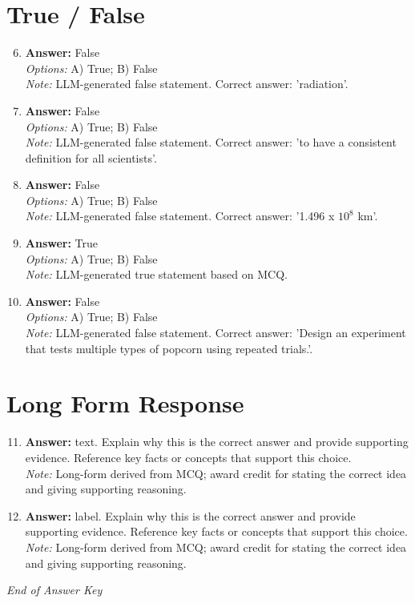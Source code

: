 \documentclass[12pt]{article}
\begin{document}
\section*{True / False}
\begin{enumerate}[label=\arabic*.]
\setcounter{enumi}{5}
\item \textbf{Answer:} False
\\ \textit{Options:} A) True; B) False
\\ \textit{Note:} LLM-generated false statement. Correct answer: 'radiation'.
\item \textbf{Answer:} False
\\ \textit{Options:} A) True; B) False
\\ \textit{Note:} LLM-generated false statement. Correct answer: 'to have a consistent definition for all scientists'.
\item \textbf{Answer:} False
\\ \textit{Options:} A) True; B) False
\\ \textit{Note:} LLM-generated false statement. Correct answer: '1.496 x $10^8$ km'.
\item \textbf{Answer:} True
\\ \textit{Options:} A) True; B) False
\\ \textit{Note:} LLM-generated true statement based on MCQ.
\item \textbf{Answer:} False
\\ \textit{Options:} A) True; B) False
\\ \textit{Note:} LLM-generated false statement. Correct answer: 'Design an experiment that tests multiple types of popcorn using repeated trials.'.
\end{enumerate}

\section*{Long Form Response}
\begin{enumerate}[label=\arabic*.]
\setcounter{enumi}{10}
\item \textbf{Answer:} text. Explain why this is the correct answer and provide supporting evidence. Reference key facts or concepts that support this choice.
\\ \textit{Note:} Long-form derived from MCQ; award credit for stating the correct idea and giving supporting reasoning.
\item \textbf{Answer:} label. Explain why this is the correct answer and provide supporting evidence. Reference key facts or concepts that support this choice.
\\ \textit{Note:} Long-form derived from MCQ; award credit for stating the correct idea and giving supporting reasoning.
\end{enumerate}

\vfill
\noindent\textit{End of Answer Key}
\end{document}
